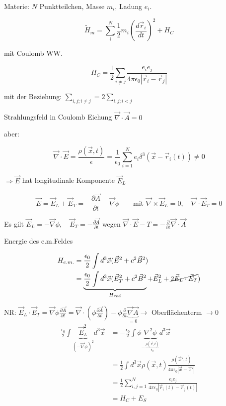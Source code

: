 Materie: \(N\) Punktteilchen, Masse \(m_i\), Ladung \(e_i\). 

\[\tilde H_m = \sum_i^N \frac{1}{2}m_i (\frac{d\vec r_i}{dt})^2 + H_C\]

mit Coulomb WW.

\[H_C = \frac{1}{2}\sum_{i\neq j} \frac{e_ie_j}{4\pi\epsilon_0|\vec r_i-\vec r_j|}\]

mit der Beziehung: \(\sum_{i,j;i\neq j} = 2\sum_{i,j;i<j}\)

Strahlungsfeld in Coulomb Eichung \(\vec \nabla\cdot\vec A = 0\)

aber:

\[ \vec \nabla\cdot\vec E = \frac{\rho (\vec x,t)}{\epsilon} = \frac{1}{\epsilon_0}\sum_{i=1}^N e_i\delta^3(\vec x-\vec r_i(t))\neq 0\]

\(\Rightarrow \vec E\) hat longitudinale Komponente \(\vec E_L\)

\[\vec E = \vec E_L + \vec E_T = -\frac{\partial \vec A}{\partial t}-\vec \nabla\phi\qquad\text{mit }\vec\nabla\times\vec E_L = 0,\quad\vec\nabla\cdot\vec E_T = 0\]


Es gilt \(\boxed{\vec E_L = -\vec \nabla\phi,\quad \vec E_T = -\frac{\partial \vec A}{\partial t}} \) wegen \(\vec \nabla\cdot\vec E-T = -\frac{\partial }{\partial t}\vec \nabla\cdot\vec A \)

Energie des e.m.Feldes

\begin{align}
H_{e.m.} &= \frac{\epsilon_0}{2}\int d^3\vec x(\vec E^2+c^2\vec B^2)\\
&=\underbrace{ \frac{\epsilon_0}{2}\int d^3\vec x(\vec E^2_T+c^2\vec B^2 }_{H_{red}} + \vec E_L^2+\cancel{2\vec E_L\cdot\vec E_T})
\end{align}

NR: \(\vec E_L\cdot\vec E_T = \vec\nabla\phi\frac{\partial\vec A}{\partial t} = \vec\nabla\cdot(\phi\frac{\partial\vec A}{\partial t}) - \phi\frac{\partial}{\partial t}\underbrace{\vec \nabla\vec A}_{=0} \rightarrow  \) Oberflächenterm \(\rightarrow 0\)
\begin{align} 
\frac{\epsilon_0}{2} \int \underbrace{ \vec E^2_L}_{(-\vec\nabla\phi)^2}d^3\vec x &= -\frac{\epsilon_0}{2} \int\phi\underbrace{\nabla^2\phi}_{-\frac{\rho(\vec x,t)}{\epsilon_0}}d^3\vec x\\
&= \frac{1}{2}\int d^3\vec x \rho(\vec x,t) \frac{\rho(\vec x',t)}{4\pi\epsilon_0|\vec x-\vec x'|} \\
&=  \frac{1}{2} \sum_{i,j=1}^N \frac{e_ie_j}{4\pi\epsilon_0|\vec r_i(t)-\vec r_j(t)|}\\
&= H_C+E_S
\end{align}


